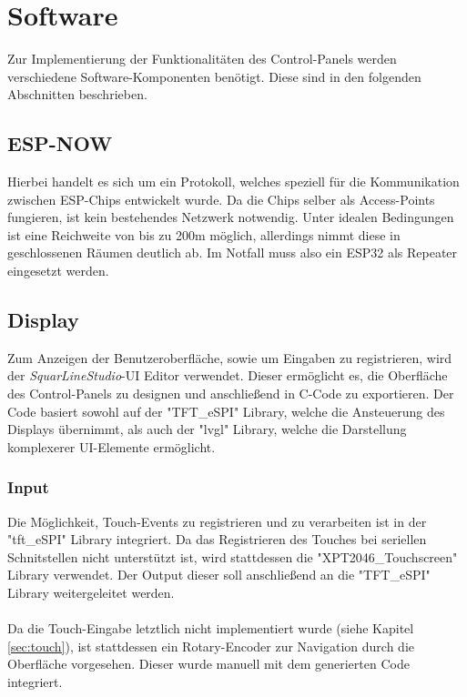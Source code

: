 \section{Software}
Zur Implementierung der Funktionalitäten des Control-Panels werden
verschiedene Software-Komponenten benötigt. Diese sind in den 
folgenden Abschnitten beschrieben.

    \subsection{ESP-NOW}
    Hierbei handelt es sich um ein Protokoll, welches
    speziell für die Kommunikation zwischen ESP-Chips
    entwickelt wurde. Da die Chips selber als Access-Points
    fungieren, ist kein bestehendes Netzwerk notwendig. Unter 
    idealen Bedingungen ist eine Reichweite von bis zu 200m 
    möglich, allerdings nimmt diese in geschlossenen Räumen
    deutlich ab. Im Notfall muss also ein ESP32 als Repeater
    eingesetzt werden.
    
    \subsection{Display} 
    Zum Anzeigen der Benutzeroberfläche, sowie um Eingaben zu 
    registrieren, wird der \textit{SquarLineStudio}-UI Editor verwendet.
    Dieser ermöglicht es, die Oberfläche des Control-Panels zu
    designen und anschließend in C-Code zu exportieren.
    Der Code basiert sowohl auf der "TFT\_eSPI" \space Library, welche die
    Ansteuerung des Displays übernimmt, als auch der "lvgl" \space Library,
    welche die Darstellung komplexerer UI-Elemente ermöglicht.

    \subsubsection{Input}
    Die Möglichkeit, Touch-Events zu registrieren und zu verarbeiten ist 
    in der "tft\_eSPI" \space Library integriert. 
    Da das Registrieren des Touches bei seriellen Schnitstellen nicht unterstützt 
    ist, wird stattdessen die "XPT2046\_Touchscreen" Library verwendet. 
    Der Output dieser soll anschließend an die "TFT\_eSPI" Library weitergeleitet
    werden.
    \\~\\
    Da die Touch-Eingabe letztlich nicht implementiert wurde 
    (siehe Kapitel \ref{sec:touch}), ist stattdessen ein Rotary-Encoder
    zur Navigation durch die Oberfläche vorgesehen. Dieser wurde manuell 
    mit dem generierten Code integriert.
